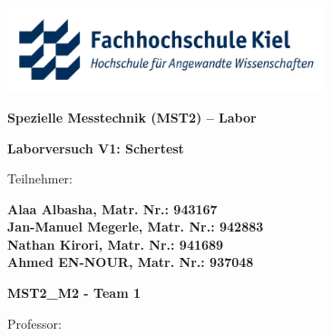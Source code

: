\documentclass[12pt,a4paper,ngerman,captions=tableheading]{scrartcl}
\begin{document}

\begin{titlepage}
\centering
\begin{onehalfspace}
    \huge \textbf{}  
    \linebreak \large \textbf{}
\end{onehalfspace}


\includegraphics[height=70pt]{Bilder/fhkiel_logo.jpg}

\vspace{0.6cm}

\begin{onehalfspace}
    \huge \textbf{Spezielle Messtechnik (MST2) – Labor}  \linebreak \large \textbf{}
\end{onehalfspace}

\vspace{0.3cm}

\begin{onehalfspace}
    \Large \textbf{Laborversuch V1:  Schertest}
\end{onehalfspace}

\vspace{1cm}
{\large Teilnehmer:} 
    \vspace{0.2cm}

     
{\large \textbf{ Alaa Albasha, Matr. Nr.: 943167\\Jan-Manuel Megerle, Matr. Nr.: 942883\\Nathan Kirori, Matr. Nr.: 941689 \\Ahmed EN-NOUR, Matr. Nr.: 937048}}


    

    \vspace{1cm}
    
\large \textbf{MST2\_M2 - Team 1}

\vspace{1cm}
{\large Professor:}


\end{titlepage}
\end{document}

